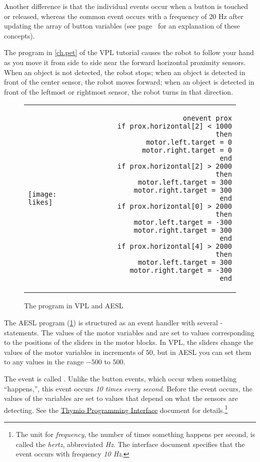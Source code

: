 Another difference is that the individual events occur when a button is
touched or released, whereas the common event  occurs with a
frequency of 20 Hz after updating the array of button variables (see
page~\pageref{pg.hz} for an explanation of these concepts).



The program  in \cref{ch.pet} of the VPL tutorial causes the
robot to follow your hand as you move it from side to side near the
forward horizontal proximity sensors.
When an object is not detected, the robot stops; when an object is
detected in front of the center sensor, the robot moves forward; when an
object is detected in front of the leftmost or rightmost sensor, the
robot turns in that direction.

\begin{figure}[hbt]
\begin{center}
\begin{tabular}{lr}
\texttt{[image: likes]} &
\begin{minipage}[b]{.4\textwidth}
\begin{footnotesize}
\begin{verbatim}
  onevent prox
    if prox.horizontal[2] < 1000 then
      motor.left.target = 0
      motor.right.target = 0
    end
    if prox.horizontal[2] > 2000 then
      motor.left.target = 300
      motor.right.target = 300
    end
    if prox.horizontal[0] > 2000 then
      motor.left.target = -300
      motor.right.target = 300
    end
    if prox.horizontal[4] > 2000 then
      motor.left.target = 300
      motor.right.target = -300
    end
\end{verbatim}
\end{footnotesize}
\end{minipage}
\end{tabular}
\caption{The  program in VPL and AESL}\label{fig.arrays}
\end{center}
\end{figure}

The AESL program (\cref{fig.arrays}) is structured as an event handler
with several -statements. The values of the motor variables
 and  are set to values
corresponding to the positions of the sliders in the motor blocks. In
VPL, the sliders change the values of the motor variables in increments
of $50$, but in AESL you can set them to any values in the range $-500$
to $500$.

The event is called . Unlike the button events, which
occur when something ``happens,'', this event occurs \emph{10 times
every second}. Before the event occurs, the values of the
 variables are set to values that depend on what the
sensors are detecting. See the\label{pg.hz}
\href{https://aseba.wikidot.com/en:thymioapi}%
{Thymio Programming Interface} document for details.\footnote{The unit
for \emph{frequency}, the number of times something happens per second, is called
the \emph{hertz}, abbreviated \emph{Hz}. The interface document specifies
that the  event occurs with frequency \emph{10 Hz}.}

